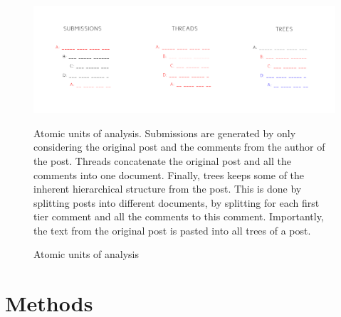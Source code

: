 \documentclass{article}
\begin{document}
\begin{figure}[H]
    \begin{centering}
    \includegraphics[scale=0.45]{../Figure/atomic_units.jpg}
    \caption{Atomic units of analysis}
    \end{centering}
    \begin{footnotesize} 
        Atomic units of analysis. Submissions are generated by only considering the original post and the comments from the author of the post. Threads concatenate the original post and all the comments into one document. Finally, trees keeps some of the inherent hierarchical structure from the post. This is done by splitting posts into different documents, by splitting for each first tier comment and all the comments to this comment. Importantly, the text from the original post is pasted into all trees of a post.
    \end{footnotesize}
\end{figure}

    \section{Methods}
\end{document}
